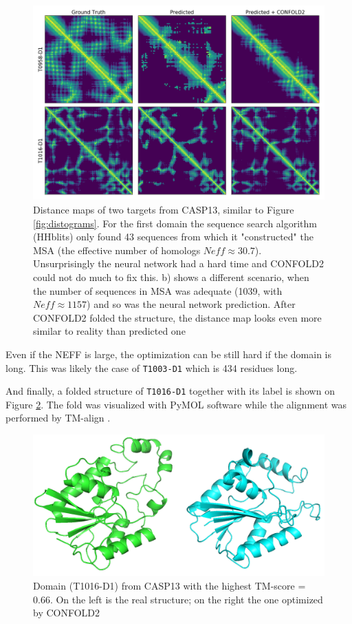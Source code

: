 \begin{figure}
    \centering
    \includegraphics[width=\linewidth]{imgs_tomas/casp_distance_maps_test_structures.png}
    \caption{Distance maps of two targets from CASP13, similar to Figure \ref{fig:distograms}. For the first domain the sequence search algorithm (HHblits) only found 43 sequences from which it "constructed" the MSA (the effective number of homologs $Neff \approx 30.7$).  Unsurprisingly the neural network had a hard time and CONFOLD2 could not do much to fix this. b) shows a different scenario, when the number of sequences in MSA was adequate (1039, with $Neff \approx 1157$) and so was the neural network prediction. After CONFOLD2 folded the structure, the distance map looks even more similar to reality than predicted one}
    \label{fig:casp_distmaps}
\end{figure}

Even if the NEFF is large, the optimization can be still hard if the domain is long. This was likely the case of \texttt{T1003-D1} which is 434 residues long. 

And finally, a folded structure of \texttt{T1016-D1} together with its label is shown on Figure \ref{fig:T1016}. The fold was visualized with PyMOL \cite{pymol} software while the alignment was performed by TM-align \cite{tmalign}.

\begin{figure}
    \centering
    \includegraphics[width=\linewidth]{imgs_tomas/T1016_structure.png}
    \caption{Domain (T1016-D1) from CASP13 with the highest TM-score = 0.66. On the left is the real structure; on the right the one optimized by CONFOLD2}
    \label{fig:T1016}
\end{figure}

